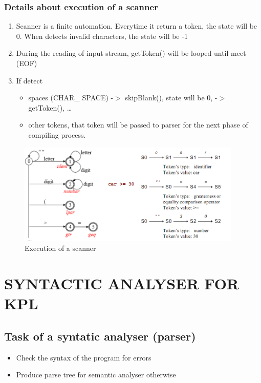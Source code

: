 \documentclass[12pt, a4paper]{report}
\begin{document}
			\subsection{Details about execution of a scanner}
				\begin{enumerate}
					\item Scanner is a finite automation. Everytime it return a token, the state will be 0.  When detects invalid characters, the state will be -1
					\item During the reading of input stream,  getToken() will be looped until meet (EOF)
					\item If detect
					\begin{itemize}
						\item spaces (CHAR\_ SPACE)  -$>$ skipBlank(), state will be 0,  -$>$ getToken(), \ldots
      					\item other tokens, that token will be passed to parser for the next phase of compiling process.
					\end{itemize}
				\end{enumerate}
				\begin{figure}[t!]
					\centering
					\includegraphics[width=0.95\textwidth]{execLex.png}
					\caption{Execution of a scanner}
					\label{fig:execLex}
				\end{figure}
	\chapter{SYNTACTIC ANALYSER FOR KPL}
	\newpage
		\section{Task of a syntatic analyser (parser)}
			\begin{itemize}
				\item Check the syntax of the program for errors
     			\item Produce parse tree for semantic analyser otherwise
			\end{itemize}
\end{document}
